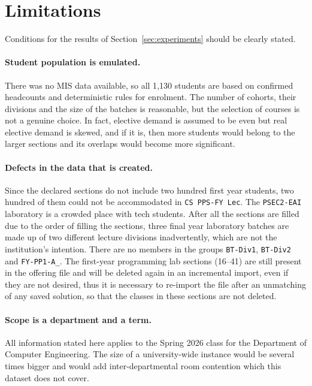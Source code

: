 \section{Limitations}
\label{sec:limitations}

Conditions for the results of Section~\ref{sec:experiments} should be clearly stated.

\paragraph{Student population is emulated.} There was no MIS data available, so all 1{,}130 students
are based on confirmed headcounts and deterministic rules for enrolment. The number of cohorts,
their divisions and the size of the batches is reasonable, but the selection of courses is not a
genuine choice. In fact, elective demand is assumed to be even but real elective demand is skewed,
and if it is, then more students would belong to the larger sections and its overlaps would become
more significant.

\paragraph{Defects in the data that is created.} Since the declared sections do not include two
hundred first year students, two hundred of them could not be accommodated in
\texttt{CS PPS-FY Lec}. The \texttt{PSEC2-EAI} laboratory is a crowded place with tech students.
After all the sections are filled due to the order of filling the sections, three final year
laboratory batches are made up of two different lecture divisions inadvertently, which are not the
institution's intention. There are no members in the groups \texttt{BT-Div1}, \texttt{BT-Div2} and
\texttt{FY-PP1-A\_}. The first-year programming lab sections (16--41) are still present in the
offering file and will be deleted again in an incremental import, even if they are not desired,
thus it is necessary to re-import the file after an unmatching of any saved solution, so that the
classes in these sections are not deleted.

\paragraph{Scope is a department and a term.} All information stated here applies to the Spring
2026 class for the Department of Computer Engineering. The size of a university-wide instance
would be several times bigger and would add inter-departmental room contention which this dataset
does not cover.

